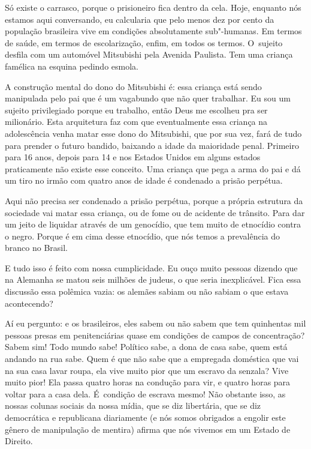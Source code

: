  

Só existe o carrasco, porque o prisioneiro fica dentro da cela. Hoje,
enquanto nós estamos aqui conversando, eu calcularia que pelo menos dez
por cento da população brasileira vive em condições absolutamente
sub"-humanas. Em termos de saúde, em termos de escolarização, enfim, em
todos os termos. O~sujeito desfila com um automóvel Mitsubishi pela
Avenida Paulista. Tem uma criança famélica na esquina pedindo esmola.

 

A construção mental do dono do Mitsubishi é: essa criança está sendo
manipulada pelo pai que é um vagabundo que não quer trabalhar. Eu sou um
sujeito privilegiado porque eu trabalho, então Deus me escolheu pra ser
milionário. Esta arquitetura faz com que eventualmente essa criança na
adolescência venha matar esse dono do Mitsubishi, que por sua vez, fará
de tudo para prender o futuro bandido, baixando a idade da maioridade
penal. Primeiro para 16 anos, depois para 14 e nos Estados Unidos em
alguns estados praticamente não existe esse conceito. Uma criança que
pega a arma do pai e dá um tiro no irmão com quatro anos de idade é
condenado a prisão perpétua.

 

Aqui não precisa ser condenado a prisão perpétua, porque a própria
estrutura da sociedade vai matar essa criança, ou de fome ou de acidente
de trânsito. Para dar um jeito de liquidar através de um genocídio, que
tem muito de etnocídio contra o negro. Porque é em cima desse etnocídio,
que nós temos a prevalência do branco no Brasil.

 

E tudo isso é feito com nossa cumplicidade. Eu ouço muito pessoas
dizendo que na Alemanha se matou seis milhões de judeus, o que seria
inexplicável. Fica essa discussão essa polêmica vazia: os alemães sabiam
ou não sabiam o que estava acontecendo?

 

Aí eu pergunto: e os brasileiros, eles sabem ou não sabem que tem
quinhentas mil pessoas presas em penitenciárias quase em condições de
campos de concentração? Sabem sim! Todo mundo sabe! Político sabe, a dona
de casa sabe, quem está andando na rua sabe. Quem é que não sabe que a
empregada doméstica que vai na sua casa lavar roupa, ela vive
muito pior que um escravo da senzala? Vive muito pior! Ela passa quatro
horas na condução para vir, e quatro horas para voltar para a casa dela.
É~condição de escrava mesmo! Não obstante isso, as nossas colunas
sociais da nossa mídia, que se diz libertária, que se diz democrática e
republicana diariamente (e nós somos obrigados a engolir este gênero de
manipulação de mentira) afirma que nós vivemos em um Estado de Direito.


